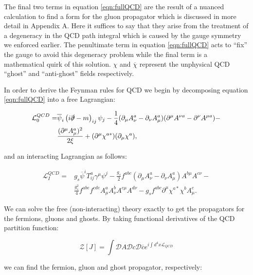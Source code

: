 	The final two terms in equation \eqref{eqn:fullQCD} are the result of a nuanced calculation to find a form
	for the gluon propagator which is discussed in more detail in Appendix A.  Here it suffices to say that they
	arise from the treatment of a degeneracy in the QCD path integral which is caused by the gauge symmetry we
	enforced earlier.  The penultimate term in equation \eqref{eqn:fullQCD} acts to ``fix'' the gauge to avoid this
	degeneracy problem while the final term is a mathematical quirk of this solution.  $\chi$ and $\overline{\chi}$
	represent the unphysical QCD ``ghost'' and ``anti-ghost'' fields respectively.

	In order to derive the Feynman rules for QCD we begin by decomposing equation \eqref{eqn:fullQCD} into a free Lagrangian:

	\begin{align*}
		\mathcal{L}_0^{QCD} =  &\overline{\psi}_i\left(i\slashed \partial-m\right)_{ij}\psi_j - \frac{1}{4}(\partial_{\mu}A_{\nu}^a - \partial_{\nu}A_{\mu}^a)(\partial^{\mu}A^{\nu a} - \partial^{\nu}A^{\mu a}) -\\
			               &\frac{(\partial^\mu A_\mu^a)^2}{2\xi} + (\partial^\mu \chi^{a*})(\partial_\mu \chi^a),
	\end{align*}

	and an interacting Lagrangian as follows:

	\begin{align*}
		\mathcal{L}_{I}^{QCD} = &g_s\overline{\psi}^i T^a_{ij}\gamma^\mu\psi^j - \frac{g_s}{2}f^{abc}(\partial_{\mu}A^a_{\nu} - \partial_{\nu}A^a_{\mu})A^{b\mu}A^{c\nu}- \\
		&\frac{g_s^2}{4}f^{abe}f^{cde}A^a_\mu A^b_\nu A^{c\mu}A^{d\nu} - g_sf^{abc}\partial^\mu\chi^{a*}\chi^bA^c_\mu.
	\end{align*}

	We can solve the free (non-interacting) theory exactly to get the propagators for the fermions, gluons
	and ghosts.  By taking functional derivatives of the QCD partition function:

	\begin{equation}
		\mathcal{Z}[J] = \int \mathcal{D}A \mathcal{D}c \mathcal{D}\overline{c}e^{i\int d^4x\mathcal{L}_{QCD}}
	\end{equation}

	we can find the fermion, gluon and ghost propagator, respectively:

